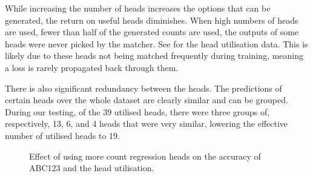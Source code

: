 \documentclass[../thesis.tex]{subfiles}
\begin{document}
While increasing the number of heads increases the options that can be generated, the return on useful heads diminishes.
When high numbers of heads are used, fewer than half of the generated counts are used, \ie the outputs of some heads were never picked by the matcher. 
See  for the head utilisation data. 
This is likely due to these heads not being matched frequently during training, meaning a loss is rarely propagated back through them. 

There is also significant redundancy between the heads. The predictions of certain heads over the whole dataset are clearly similar and can be grouped. 
During our testing, of the 39 utilised heads, there were three groups of, respectively, 13, 6, and 4 heads that were very similar, lowering the effective number of utilised heads to 19. 

\begin{table}
    \centering
    \resizebox{\textwidth}{!}{%
    
    }
    \caption{Effect of using more count regression heads. Increasing the number of pre-matching predictions improves the quantitative results of our method. However, as the number of heads increases, the percentage of heads that are frequently ($>0.4\%$) matched decreases.}
    \label{table__ABC123__ablation_mhat}
\end{table}



\begin{figure}
    \centering  
    \begin{subfigure}{0.49\linewidth}
        \centering
                
    \end{subfigure}
        \begin{subfigure}{0.49\linewidth}
        \centering
                
    \end{subfigure}
    \caption{Effect of using more count regression heads on the accuracy of ABC123 and the head utilisation.}
    \label{fig__ABC123__ablation_mhat}
\end{figure}
\end{document}
